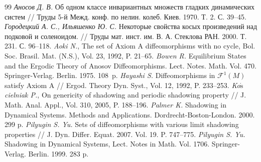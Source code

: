 \documentclass[12pt]{article}
\begin{document}
{\begin{thebibliography}{99}
\textit{Аносов Д. В.} Об одном классе инвариантных множеств гладких
динамических систем // Труды 5-й Межд. конф. по нелин. колеб. Киев. 1970. Т. 2. С. 39--45.
\textit{Городецкий А. С., Ильяшенко Ю. С.} Некоторые свойства косых про\-изведений над подковой и соленоидом. // Труды мат. инст. им. В. А. Стеклова РАН. 2000. Т. 231. С. 96--118.
\textit{Aoki N.}, The set of Axiom A diffeomorphisms with no cycle, Bol.
Soc. Brasil. Mat. (N.S.), Vol. 23, 1992, P. 21--65.
\textit{Bowen R.} Equilibrium States and the Ergodic Theory of Anosov
Diffeomorphisms. Lect. Notes. Math. Vol. 470. Springer-Verlag.
Berlin. 1975. 108~p.
\textit{Hayashi S.} Diffeomorphisms in $\mathcal{F}^1(M)$ satisfy Axiom A // Ergod. Theory
Dyn. Syst., Vol. 12, 1992, P. 233--253.
\textit{Ko$\acute{\mbox{s}}$cielniak P.}, On genericity of shadowing and periodic shadowing
property // J. Math. Anal. Appl., Vol. 310, 2005, P. 188--196.
 \textit{Palmer K.} Shadowing in Dynamical Systems. Methods and Applications. Dordrecht-Boston-London. 2000. 299 p.  
 \textit{Pilyugin S. Yu.} Sets of diffeomorphisms with various limit shadowing
properties // J. Dyn. Differ. Equat. 2007. Vol. 19. P. 747--775.
 \textit{Pilyugin S. Yu.} Shadowing in Dynamical Systems, Lect. Notes in Math. Vol. 1706. Springer-Verlag. Berlin. 1999. 283 p. 

\end{thebibliography}}
\end{document}
